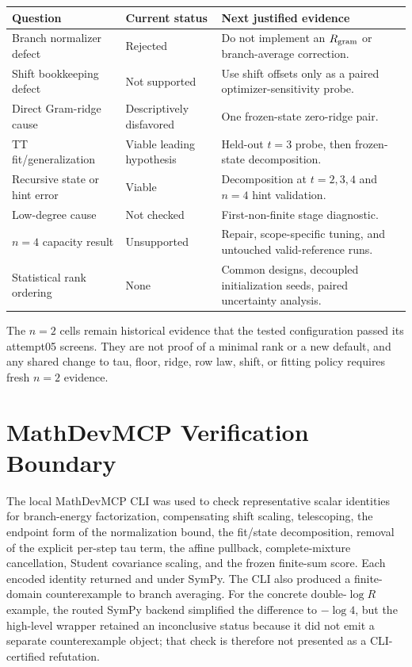 \documentclass[11pt]{article}
\begin{document}
\begin{center}
\begin{tabular}{p{}p{}p{}}
\toprule
Question & Current status & Next justified evidence\\
\midrule
Branch normalizer defect & Rejected & Do not implement an $R_{\rm gram}$ or
branch-average correction.\\
Shift bookkeeping defect & Not supported & Use shift offsets only as a paired
optimizer-sensitivity probe.\\
Direct Gram-ridge cause & Descriptively disfavored & One frozen-state
zero-ridge pair.\\
TT fit/generalization & Viable leading hypothesis & Held-out $t=3$ probe,
then frozen-state decomposition.\\
Recursive state or hint error & Viable & Decomposition at $t=2,3,4$ and
$n=4$ hint validation.\\
Low-degree cause & Not checked & First-non-finite stage diagnostic.\\
$n=4$ capacity result & Unsupported & Repair, scope-specific tuning, and
untouched valid-reference runs.\\
Statistical rank ordering & None & Common designs, decoupled initialization
seeds, paired uncertainty analysis.\\
\bottomrule
\end{tabular}
\end{center}

The $n=2$ cells remain historical evidence that the tested configuration
passed its attempt05 screens. They are not proof of a minimal rank or a new
default, and any shared change to tau, floor, ridge, row law, shift, or fitting
policy requires fresh $n=2$ evidence.

\section{MathDevMCP Verification Boundary}

The local MathDevMCP CLI was used to check representative scalar identities
for branch-energy factorization, compensating shift scaling, telescoping, the
endpoint form of the normalization bound, the fit/state decomposition, removal
of the explicit per-step tau term, the affine pullback, complete-mixture
cancellation, Student covariance scaling, and the frozen finite-sum score. Each
encoded identity returned  and
 under SymPy. The
CLI also produced a finite-domain counterexample to branch averaging. For the
concrete double-$\log R$ example, the routed SymPy backend simplified the
difference to $-\log 4$, but the high-level wrapper retained an inconclusive
status because it did not emit a separate counterexample object; that check is
therefore not presented as a CLI-certified refutation.
\end{document}
